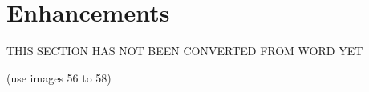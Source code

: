 \section{Enhancements}
\label{sec:component_diagrams-enhancements}

THIS SECTION HAS NOT BEEN CONVERTED FROM WORD YET

(use images 56 to 58)


